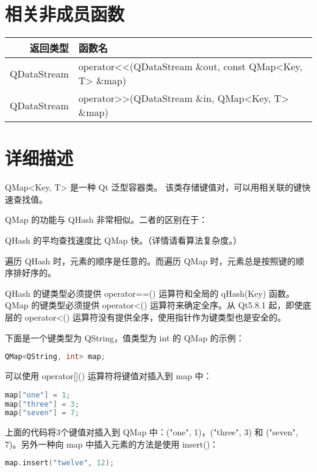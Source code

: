 \section{相关非成员函数}

\begin{longtable}[l]{|r|l|}
\hline
返回类型  & 	函数名 \\
\hline
QDataStream &	operator<<(QDataStream \&out, const QMap<Key, T> \&map) \\ 
\hline
QDataStream &	operator>>(QDataStream \&in, QMap<Key, T> \&map) \\  
\hline
\end{longtable}

\section{详细描述}

QMap<Key, T> 是一种 Qt 泛型容器类。
该类存储键值对，可以用相关联的键快速查找值。

QMap 的功能与 QHash 非常相似。二者的区别在于：

\begin{compactitem}
\item QHash 的平均查找速度比 QMap 快。（详情请看算法复杂度。）
\item 遍历 QHash 时，元素的顺序是任意的。而遍历 QMap 时，元素总是按照键的顺序排好序的。
\item QHash 的键类型必须提供 operator==() 运算符和全局的 qHash(Key) 函数。QMap 的键类型必须提供 operator<() 运算符来确定全序。从 Qt5.8.1 起，即使底层的 operator<() 运算符没有提供全序，使用指针作为键类型也是安全的。
\end{compactitem}

下面是一个键类型为 QString，值类型为 int 的 QMap 的示例：

\begin{lstlisting}[language=C++]
QMap<QString, int> map;
\end{lstlisting}

可以使用 operator[]() 运算符将键值对插入到 map 中：

\begin{lstlisting}[language=C++]
map["one"] = 1;
map["three"] = 3;
map["seven"] = 7;
\end{lstlisting}


上面的代码将3个键值对插入到 QMap 中：("one", 1)，("three", 3) 和 ("seven", 7)。另外一种向 map 中插入元素的方法是使用 insert()：

\begin{lstlisting}[language=C++]
map.insert("twelve", 12);
\end{lstlisting}

